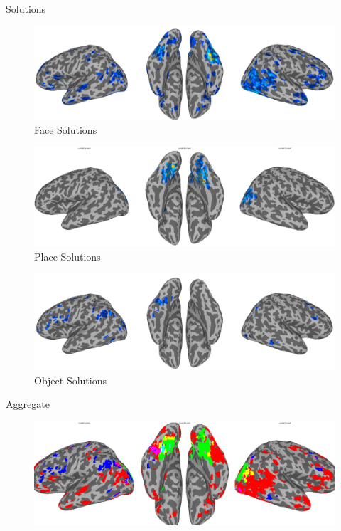 \documentclass[final]{beamer}
\newlength{\introcolwid}
\begin{document}
\begin{frame}[t]
\begin{columns}[t]
\begin{column}{\introcolwid}
		\begin{block}{Solutions}
			\begin{figure}
				\includegraphics[width=\textwidth]{figures/face_gt5c.png}
				\caption{Face Solutions}
			\end{figure}
			\begin{figure}
				\includegraphics[width=\textwidth]{figures/place_gt5c.png}
				\caption{Place Solutions}
			\end{figure}
			\begin{figure}
				\includegraphics[width=\textwidth]{figures/object_gt5c.png}
				\caption{Object Solutions}
			\end{figure}
		\end{block}
          \begin{block}{Aggregate}
			\begin{figure}
				\includegraphics[width=\textwidth]{figures/FPO_gt5b2.png}

\end{figure}
\end{block}
\end{column}
\end{columns}
\end{frame}
\end{document}
